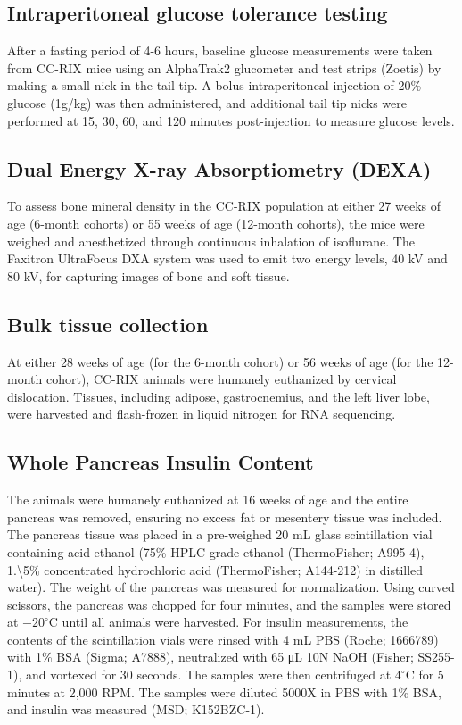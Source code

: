 \documentclass[
]{article}
\begin{document}
\subsection{Intraperitoneal glucose tolerance
testing}\label{intraperitoneal-glucose-tolerance-testing}

After a fasting period of 4-6 hours, baseline glucose measurements were
taken from CC-RIX mice using an AlphaTrak2 glucometer and test strips
(Zoetis) by making a small nick in the tail tip. A bolus intraperitoneal
injection of 20\% glucose (1g/kg) was then administered, and additional
tail tip nicks were performed at 15, 30, 60, and 120 minutes
post-injection to measure glucose levels.

\subsection{Dual Energy X-ray Absorptiometry
(DEXA)}\label{dual-energy-x-ray-absorptiometry-dexa}

To assess bone mineral density in the CC-RIX population at either 27
weeks of age (6-month cohorts) or 55 weeks of age (12-month cohorts),
the mice were weighed and anesthetized through continuous inhalation of
isoflurane. The Faxitron UltraFocus DXA system was used to emit two
energy levels, 40 kV and 80 kV, for capturing images of bone and soft
tissue.

\subsection{Bulk tissue collection}\label{bulk-tissue-collection}

At either 28 weeks of age (for the 6-month cohort) or 56 weeks of age
(for the 12-month cohort), CC-RIX animals were humanely euthanized by
cervical dislocation. Tissues, including adipose, gastrocnemius, and the
left liver lobe, were harvested and flash-frozen in liquid nitrogen for
RNA sequencing.

\subsection{Whole Pancreas Insulin
Content}\label{whole-pancreas-insulin-content}

The animals were humanely euthanized at 16 weeks of age and the entire
pancreas was removed, ensuring no excess fat or mesentery tissue was
included. The pancreas tissue was placed in a pre-weighed 20 mL glass
scintillation vial containing acid ethanol (75\% HPLC grade ethanol
(ThermoFisher; A995-4), 1.\textbackslash5\% concentrated hydrochloric
acid (ThermoFisher; A144-212) in distilled water). The weight of the
pancreas was measured for normalization. Using curved scissors, the
pancreas was chopped for four minutes, and the samples were stored at
\(-20^{\circ}\)C until all animals were harvested. For insulin
measurements, the contents of the scintillation vials were rinsed with 4
mL PBS (Roche; 1666789) with 1\% BSA (Sigma; A7888), neutralized with 65
\si{\micro\liter} 10N NaOH (Fisher; SS255-1), and vortexed for 30
seconds. The samples were then centrifuged at \(4^{\circ}\)C for 5
minutes at 2,000 RPM. The samples were diluted 5000X in PBS with 1\%
BSA, and insulin was measured (MSD; K152BZC-1).
\end{document}
